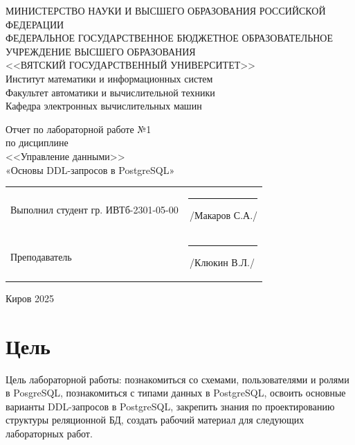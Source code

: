 \documentclass[a4paper,14pt]{extarticle}
\begin{document}
  \newpage\thispagestyle{empty}
  \begin{center}
    \MakeUppercase{
      Министерство науки и высшего образования Российской Федерации\\
      Федеральное государственное бюджетное образовательное учреждение высшего образования\\
      <<Вятский Государственный Университет>>\\
    }
    Институт математики и информационных систем\\
    Факультет автоматики и вычислительной техники\\
    Кафедра электронных вычислительных машин
  \end{center}
  \vfill

  \begin{center}
    Отчет по лабораторной работе №1\\
    по дисциплине\\
    <<Управление данными>>\\
    «Основы DDL-запросов в PostgreSQL»\\
  \end{center}
  \vfill

  \noindent
  \begin{tabular}{ll}
    Выполнил студент гр. ИВТб-2301-05-00 \hspace{5mm} &
    \rule[-1mm]{25mm}{0.10mm}\,/Макаров С.А./\\
    
    Преподаватель & \rule[-1mm]{25mm}{0.10mm}\,/Клюкин В.Л./\\
  \end{tabular}

  \vfill
  \begin{center}
    Киров 2025
  \end{center}

  \newpage
  \section*{Цель}
  Цель лабораторной работы: познакомиться со схемами, пользователями и ролями в PosgreSQL, познакомиться с типами данных в PostgreSQL, освоить основные варианты DDL-запросов в PostgreSQL, закрепить знания по проектированию структуры реляционной БД, создать рабочий материал для следующих лабораторных работ.
\end{document}
